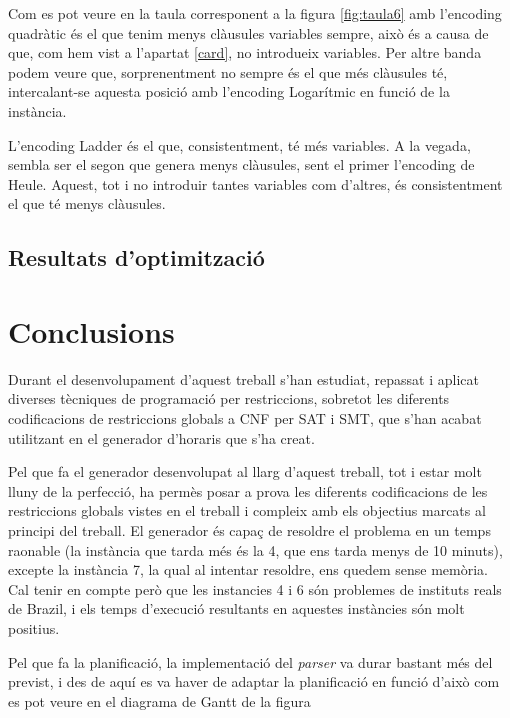 \documentclass[11pt,a4paper,twoside]{report}
\begin{document}
  Com es pot veure en la taula corresponent a la figura \ref{fig:taula6} amb l'encoding quadràtic és el que tenim menys clàusules variables sempre, això és a causa de que, com hem vist a l'apartat \ref{card}, no introdueix variables. 
  Per altre banda podem veure que, sorprenentment no sempre és el que més clàusules té, intercalant-se aquesta posició amb l'encoding Logarítmic en funció de la instància. 

  L'encoding Ladder és el que, consistentment, té més variables. 
  A la vegada, sembla ser el segon que genera menys clàusules, sent el primer l'encoding de Heule. Aquest, tot i no introduir tantes variables com d'altres, és consistentment el que té menys clàusules.

  \section{Resultats d'optimització}




  \chapter{Conclusions}

  Durant el desenvolupament d'aquest treball s'han estudiat, repassat i aplicat diverses tècniques de programació per restriccions, 
  sobretot les diferents codificacions de restriccions globals a CNF per SAT i SMT, que s'han acabat utilitzant en el generador d'horaris que s'ha creat. 

  Pel que fa el generador desenvolupat al llarg d'aquest treball, tot i estar molt lluny de la perfecció, 
  ha permès posar a prova les diferents codificacions de les restriccions globals vistes en el treball 
  i compleix amb els objectius marcats al principi del treball. El generador és capaç de resoldre el problema en un temps raonable (la instància que tarda més és la 4, que ens tarda menys de 10 minuts), 
  excepte la instància 7, la qual al intentar resoldre, ens quedem sense memòria. Cal tenir en compte però que les instancies 4 i 6 són problemes de instituts reals de Brazil, i els temps d'execució resultants en aquestes instàncies són molt positius.

  Pel que fa la planificació, la implementació del \textit{parser} va durar bastant més del previst, i des de aquí es va haver de adaptar la planificació en funció d'això com es pot veure en el diagrama de Gantt de la figura \label{fig:Gantt2}
\end{document}
